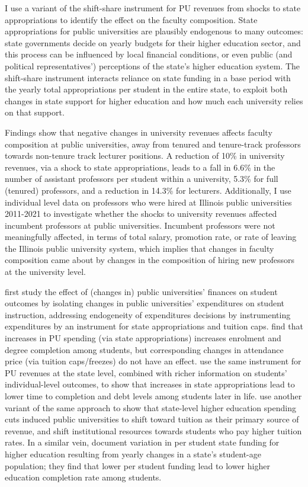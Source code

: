 \documentclass[notitlepage,12pt]{article}
\begin{document}
I use a variant of the \cite{NBERw23736,NBERw27885} shift-share instrument for PU revenues from shocks to state appropriations to identify the effect on the faculty composition.
State appropriations for public universities are plausibly endogenous to many outcomes: state governments decide on yearly budgets for their higher education sector, and this process can be influenced by local financial conditions, or even public (and political representatives') perceptions of the state's higher education system.
The shift-share instrument interacts reliance on state funding in a base period with the yearly total appropriations per student in the entire state, to exploit both changes in state support for higher education and how much each university relies on that support.

Findings show that negative changes in university revenues affects faculty composition at public universities, away from tenured and tenure-track professors towards non-tenure track lecturer positions.
A reduction of 10\% in university revenues, via a shock to state appropriations, leads to a fall in 6.6\% in the number of assistant professors per student within a university, 5.3\% for full (tenured) professors, and a reduction in 14.3\% for lecturers.
Additionally, I use individual level data on professors who were hired at Illinois public universities 2011-2021 to investigate whether the shocks to university revenues affected incumbent professors at public universities.
Incumbent professors were not meaningfully affected, in terms of total salary, promotion rate, or rate of leaving the Illinois public university system, which implies that changes in faculty composition came about by changes in the composition of hiring new professors at the university level.

\cite{NBERw23736} first study the effect of (changes in) public universities' finances on student outcomes by isolating changes in public universities' expenditures on student instruction, addressing endogeneity of expenditures decisions by instrumenting expenditures by an instrument for state appropriations and tuition caps.
\cite{NBERw23736} find that increases in PU spending (via state appropriations) increases enrolment and degree completion among students, but corresponding changes in attendance price (via tuition caps/freezes) do not have an effect.
\cite{chakrabarti2018effect,NBERw27885} use the same instrument for PU revenues at the state level, combined with richer information on students' individual-level outcomes, to show that increases in state appropriations lead to lower time to completion and debt levels among students later in life.
\cite{bound2019public} use another variant of the same approach to show that state-level higher education spending cuts induced public universities to shift toward tuition as their primary source of revenue, and shift institutional resources towards students who pay higher tuition rates.
In a similar vein, \cite{bound2007cohort} document variation in per student state funding for higher education resulting from yearly changes in a state's student-age population; they find that lower per student funding lead to lower higher education completion rate among students.
\end{document}

